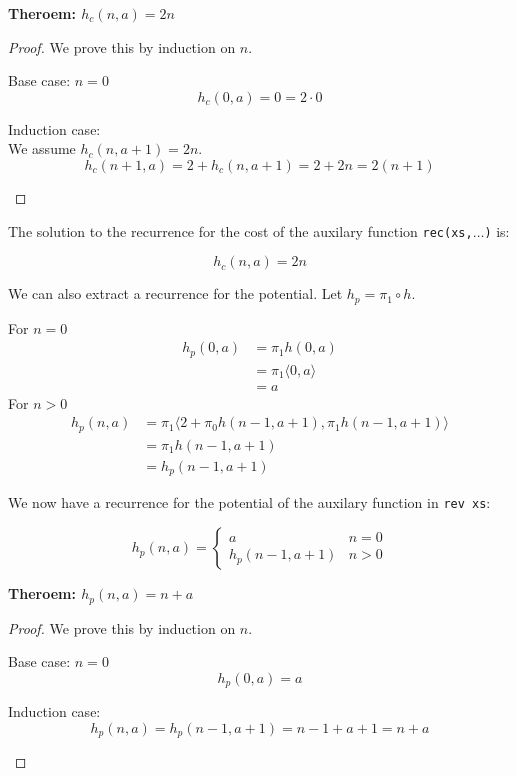 \documentclass[12pt,letterpaper]{article}
\begin{document}
\textbf{Theroem: $h_c(n,a) = 2n$}
\begin{proof}
  We prove this by induction on $n$.
  \begin{description}
    \item{Base case: $n=0$}\hfill \\
      \[ h_c(0,a) = 0 = 2\cdot0 \]
    \item{Induction case:}\hfill \\
      We assume $h_c(n,a+1) = 2n$.\[h_c(n+1,a) = 2 + h_c(n,a+1) = 2 + 2n = 2(n+1)\]
  \end{description}
\end{proof}  

The solution to the recurrence for the cost of the auxilary function \texttt{rec(xs,$\dots$)} is:
\begin{framed}
  \[h_c(n,a) = 2n \]
\end{framed}


We can also extract a recurrence for the potential. Let $h_p = \pi_1 \circ h$.

For $n=0$
\begin{align*}
h_p(0,a) &= \pi_1 h(0,a)\\
&= \pi_1 \langle 0, a\rangle\\
&= a
\end{align*}
For $n>0$
\begin{align*}
h_p(n,a) &= \pi_1 \langle 2 + \pi_0 h(n-1,a+1), \pi_1 h(n-1,a+1)\rangle\\
&= \pi_1 h(n-1,a+1)\\
&= h_p (n-1,a+1)
\end{align*}

We now have a recurrence for the potential of the auxilary function in \texttt{rev xs}:
\begin{framed}
  \begin{equation}
    h_p(n,a) = \begin{cases}
      a & n = 0 \\
      h_p(n-1,a+1) & n > 0
    \end{cases}
  \end{equation}
\end{framed}

\textbf{Theroem: $h_p(n,a) = n + a$}
\begin{proof}
  We prove this by induction on $n$.
  \begin{description}
    \item{Base case: $n=0$}\hfill \\
      \[ h_p(0,a) = a \]
    \item{Induction case:}\hfill \\
      \[h_p(n,a) = h_p(n-1,a+1) = n - 1 + a + 1 = n + a\]
  \end{description}
\end{proof}  
\end{document}
